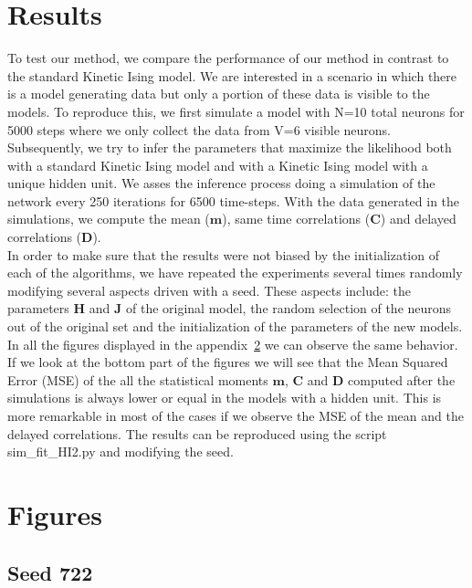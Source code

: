 \documentclass{article}
\def\*#1{\mathbf{#1}}
\begin{document}
\section{Results}

To test our method, we compare the performance of our method in contrast to the standard Kinetic Ising model. We are interested in a scenario in which there is a model generating data but only a portion of these data is visible to the models. To reproduce this, we first simulate a model with N=10 total neurons for 5000 steps where we only collect the data from V=6 visible neurons. Subsequently, we try to infer the parameters that maximize the likelihood both with a standard Kinetic Ising model and with a Kinetic Ising model with a unique hidden unit. We asses the inference process doing a simulation of the network every 250 iterations for 6500 time-steps. With the data generated in the simulations, we compute the mean ($\*m$), same time correlations ($\*C$) and delayed correlations ($\*D$).\\

In order to make sure that the results were not biased by the initialization of each of the algorithms, we have repeated the experiments several times randomly modifying several aspects driven with a seed. These aspects include: the parameters $\*H$ and $\*J$ of the original model, the random selection of the neurons out of the original set and the initialization of the parameters of the new models.\\

In all the figures displayed in the appendix~\ref{sec:figures} we can observe the same behavior. If we look at the bottom part of the figures we will see that the Mean Squared Error (MSE) of the all the statistical moments $\*m$,  $\*C$ and  $\*D$ computed after the simulations is always lower or equal in the models with a hidden unit. This is more remarkable in most of the cases if we observe the MSE of the mean and the delayed correlations. The results can be reproduced using the script sim\_fit\_HI2.py and modifying the seed. 





\newpage
\appendix
\section{Figures}
\label{sec:figures}

\subsection{Seed 722}
\end{document}

